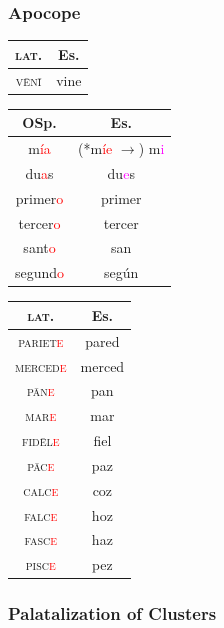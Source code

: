 \documentclass{report}[12pt]
\begin{document}
\subsubsection{Apocope}\label{sec:apocope}

\begin{tcolorbox}

\end{tcolorbox}

\begin{tabular}{c c}
  \textsc{lat.} & Es. \\
  \hline
  \textsc{v\={e}n\={i}} & vine \\  
\end{tabular}

\begin{tabular}{c c}
  OSp. & Es. \\
  \hline
  m\textcolor{red}{ía} & (*m\textcolor{red}{íe} $\rightarrow$) m\textcolor{magenta}{i} \\
  du\textcolor{red}{a}s & du\textcolor{magenta}{e}s \\
  primer\textcolor{red}{o} & primer \\
  tercer\textcolor{red}{o} & tercer \\
  sant\textcolor{red}{o} & san \\
  segund\textcolor{red}{o} & según \\
\end{tabular}

\begin{tabular}{c c}
  \textsc{lat.} & Es. \\
  \hline
  \textsc{pariet\textcolor{red}{e}} & pared \\
  \textsc{merced\textcolor{red}{e}} & merced \\
  \textsc{p\={a}n\textcolor{red}{e}} & pan \\
  \textsc{mar\textcolor{red}{e}} & mar \\
  \textsc{fid\={e}l\textcolor{red}{e}} & fiel \\
  \textsc{p\={a}c\textcolor{red}{e}} & paz \\
  \textsc{calc\textcolor{red}{e}} & coz \\
  \textsc{falc\textcolor{red}{e}} & hoz \\
  \textsc{fasc\textcolor{red}{e}} & haz \\
  \textsc{pisc\textcolor{red}{e}} & pez \\
\end{tabular}

\subsubsection{Palatalization of Clusters}
\end{document}
